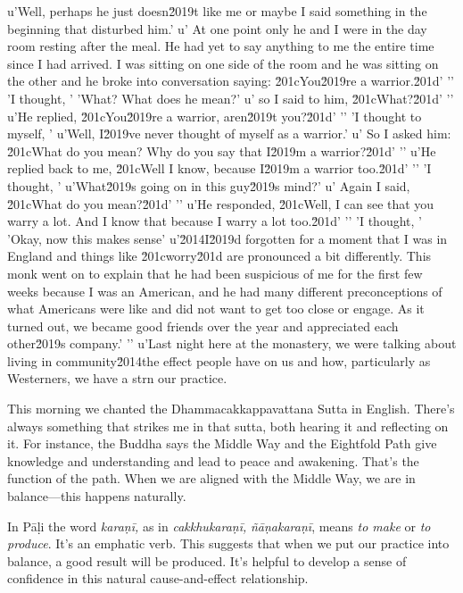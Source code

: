 u'Well, perhaps he just doesn\u2019t like me or maybe I said something in the beginning that disturbed him.'
u' At one point only he and I were in the day room resting after the meal. He had yet to say anything to me the entire time since I had arrived. I was sitting on one side of the room and he was sitting on the other and he broke into conversation saying: \u201cYou\u2019re a warrior.\u201d'
'\n'
'I thought, '
'What? What does he mean?'
u' so I said to him, \u201cWhat?\u201d'
'\n'
u'He replied, \u201cYou\u2019re a warrior, aren\u2019t you?\u201d'
'\n'
'I thought to myself, '
u'Well, I\u2019ve never thought of myself as a warrior.'
u' So I asked him: \u201cWhat do you mean? Why do you say that I\u2019m a warrior?\u201d'
'\n'
u'He replied back to me, \u201cWell I know, because I\u2019m a warrior too.\u201d'
'\n'
'I thought, '
u'What\u2019s going on in this guy\u2019s mind?'
u' Again I said, \u201cWhat do you mean?\u201d'
'\n'
u'He responded, \u201cWell, I can see that you warry a lot. And I know that because I warry a lot too.\u201d'
'\n'
'I thought, '
'Okay, now this makes sense'
u'\u2014I\u2019d forgotten for a moment that I was in England and things like \u201cworry\u201d are pronounced a bit differently. This monk went on to explain that he had been suspicious of me for the first few weeks because I was an American, and he had many different preconceptions of what Americans were like and did not want to get too close or engage. As it turned out, we became good friends over the year and appreciated each other\u2019s company.'
'\n'
u'Last night here at the monastery, we were talking about living in community\u2014the effect people have on us and how, particularly as Westerners, we have a strn 
our practice.


This morning we chanted the Dhammacakkappavattana Sutta in English. 
There's always something that strikes me in that sutta, both hearing it 
and reflecting on it. For instance, the Buddha says the Middle Way and 
the Eightfold Path give knowledge and understanding and lead to peace 
and awakening. That's the function of the path. When we are aligned 
with the Middle Way, we are in balance---this happens naturally.

In Pāḷi the word \emph{karaṇī,} as in \emph{cakkhukaraṇī,} 
\emph{ñāṇakaraṇī}, means \emph{to make} or \emph{to produce}. 
It's an emphatic verb. This suggests that when we put our practice into 
balance, a good result will be produced. It's helpful to develop a 
sense of confidence in this natural cause-and-effect relationship.

